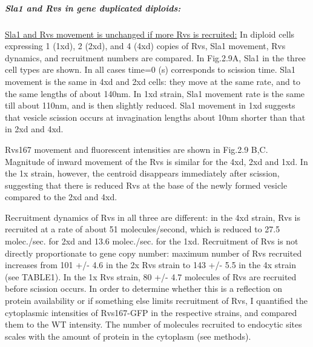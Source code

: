 		
		\subparagraph{Sla1 and Rvs in gene duplicated diploids:}
		\label{sub_rvsdiploids}
		
\underline{Sla1 and Rvs movement is unchanged if more Rvs is recruited:}
In diploid cells expressing 1 (1xd), 2 (2xd), and 4 (4xd) copies of Rvs, Sla1 movement, Rvs dynamics, and recruitment numbers are compared. 
In Fig.2.9A, Sla1 in the three cell types are shown. In all cases time=0 (s) corresponds to scission time. Sla1 movement is the same in 4xd and 2xd cells: they move at the same rate, and to the same lengths of about 140nm. In 1xd strain, Sla1 movement rate is the same till about 110nm, and is then slightly reduced. Sla1 movement in 1xd suggests that vesicle scission occurs at invagination lengths about 10nm shorter than that in 2xd and 4xd. 

Rvs167 movement and fluorescent intensities are shown in Fig.2.9 B,C. 
Magnitude of inward movement of the Rvs is similar for the 4xd, 2xd and 1xd. In the 1x strain, however, the centroid disappears immediately after scission, suggesting that there is reduced Rvs at the base of the newly formed vesicle compared to the 2xd and 4xd.

Recruitment dynamics of Rvs in all three are different: in the 4xd strain, Rvs is recruited at a rate of about 51 molecules/second, which is reduced to 27.5 molec./sec. for 2xd and 13.6 molec./sec. for the 1xd. Recruitment of Rvs is not directly proportionate to gene copy number: maximum number of Rvs recruited increases from 101 +/- 4.6 in the 2x Rvs strain to 143 +/- 5.5 in the 4x strain (see TABLE1). In the 1x Rvs strain, 80 +/- 4.7 molecules of Rvs are recruited before scission occurs. In order to determine whether this is a reflection on protein availability or if something else limits recruitment of Rvs, I quantified the cytoplasmic intensities of Rvs167-GFP in the respective strains, and compared them to the WT intensity. The number of molecules recruited to endocytic sites scales with the amount of protein in the cytoplasm (see methods).  



